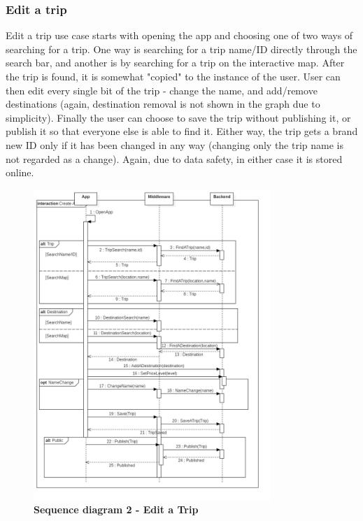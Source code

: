 \subsubsection{Edit a trip}

\hspace{\parindent}Edit a trip use case starts with opening the app and choosing one of two ways of searching for a trip. One way is searching for a trip name/ID directly through the search bar, and another is by searching for a trip on the interactive map. After the trip is found, it is somewhat "copied" to the instance of the user. User can then edit every single bit of the trip - change the name, and add/remove destinations (again, destination removal is not shown in the graph due to simplicity). Finally the user can choose to save the trip without publishing it, or publish it so that everyone else is able to find it. Either way, the trip gets a brand new ID only if it has been changed in any way (changing only the trip name is not regarded as a change). Again, due to data safety, in either case it is stored online.\\
\begin{figure}[!htb]
\centering
\includegraphics[width=0.8\textwidth]{../Graphs/Sequence2_Edit_A_Trip.png}
\caption{\label{fig:dbapiuser}\textbf{Sequence diagram 2 - Edit a Trip}}
\end{figure}
\newpage
